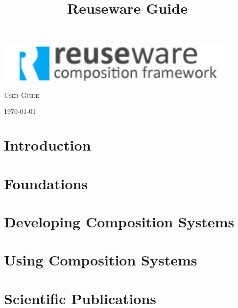\documentclass[smallheadings,headsepline,pointlessnumbers,11pt,a4paper]{scrbook}
\title{Reuseware Guide}
\let\origdoublepage\cleardoublepage
\renewcommand{\cleardoublepage}{%
  \clearpage{\pagestyle{empty}\origdoublepage}}
\begin{document}
\begin{titlepage}

\hbox{}
\vspace{4cm}

\begin{center}

\includegraphics[width=0.9\textwidth]{../latex/figures/ReusewareLogo.png}


\vspace{3cm}
{
\fontsize{60}{60}
\textsc{User Guide}
}
\end{center}

\vspace{7cm}
\begin{flushright}
\large
\today
\end{flushright}

\end{titlepage}

\cleardoublepage

\tableofcontents

\renewcommand{\listfigurename}{List of Figures}
\listoffigures
\cleardoublepage

\renewcommand{\lstlistlistingname}{List of Listings\vspace{3mm}}
\lstlistoflistings
\cleardoublepage

\mainmatter

\chapter{Introduction}

\chapter{Foundations}


\chapter{Developing Composition Systems}


\chapter{Using Composition Systems}


\chapter{Scientific Publications}



%
\end{document}
